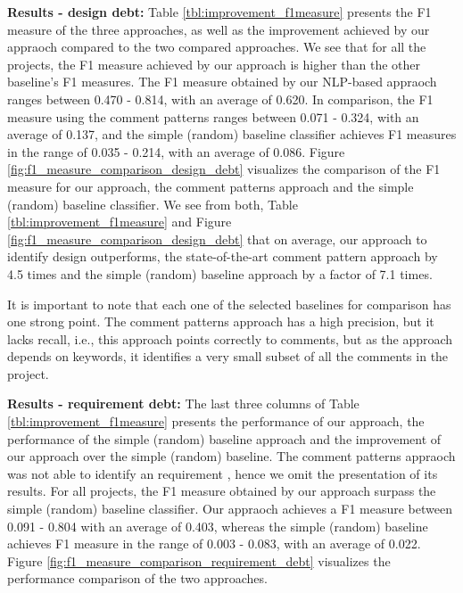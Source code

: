 \vspace{1mm}

\noindent \textbf{Results - design debt:} Table \ref{tbl:improvement_f1measure} presents the F1 measure of the three approaches, as well as the improvement achieved by our appraoch compared to the two compared approaches. We see that for all the projects, the F1 measure achieved by our approach is higher than the other baseline's F1 measures. The F1 measure obtained by our NLP-based appraoch ranges between 0.470 - 0.814, with an average of 0.620. In comparison, the F1 measure using the comment patterns ranges between 0.071 - 0.324, with an average of 0.137, and the simple (random) baseline classifier achieves F1 measures in the range of 0.035 - 0.214, with an average of 0.086. Figure \ref{fig:f1_measure_comparison_design_debt} visualizes the comparison of the F1 measure for our approach, the comment patterns approach and the simple (random) baseline classifier. We see from both, Table \ref{tbl:improvement_f1measure} and Figure \ref{fig:f1_measure_comparison_design_debt} that on average, our approach to identify design \SATD outperforms, the state-of-the-art comment pattern approach by 4.5 times and the simple (random) baseline approach by a factor of 7.1 times. 

It is important to note that each one of the selected baselines for comparison has one strong point. The comment patterns approach has a high precision, but it lacks recall, i.e., this approach points correctly to \SATD comments, but as the approach depends on keywords, it identifies a very small subset of all the \SATD comments in the project. 



 
\noindent \textbf{Results - requirement debt:}  The last three columns of Table \ref{tbl:improvement_f1measure} presents the performance of our approach, the performance of the simple (random) baseline approach and the improvement of our approach over the simple (random) baseline. The comment patterns appraoch was not able to identify an requirement \SATD, hence we omit the presentation of its results. For all projects, the F1 measure obtained by our approach surpass the simple (random) baseline classifier. Our appraoch achieves a F1 measure between 0.091 - 0.804 with an average of 0.403, whereas the simple (random) baseline achieves F1 measure in the range of 0.003 - 0.083, with an average of 0.022. Figure \ref{fig:f1_measure_comparison_requirement_debt} visualizes the performance comparison of the two approaches.

